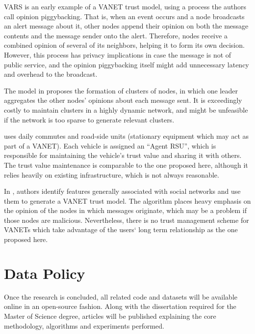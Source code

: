 \documentclass[12pt]{article}
\begin{document}
VARS \cite{dotzer2005vars} is an early example of a VANET trust model, using a process the authors call opinion piggybacking.
That is, when an event occurs and a node broadcasts an alert message about it, other nodes append their opinion on both the message contents and the message sender onto the alert.
Therefore, nodes receive a combined opinion of several of its neighbors, helping it to form its own decision.
However, this process has privacy implications in case the message is not of public service, and the opinion piggybacking itself might add unnecessary latency and overhead to the broadcast.

The model in \cite{chen2010trust} proposes the formation of clusters of nodes, in which one leader aggregates the other nodes' opinions about each message sent.
It is exceedingly costly to maintain clusters in a highly dynamic network, and might be unfeasible if the network is too sparse to generate relevant clusters.

\cite{park2011long} uses daily commutes and road-side units (stationary equipment which may act as part of a VANET).
Each vehicle is assigned an ``Agent RSU'', which is responsible for maintaining the vehicle's trust value and sharing it with others.
The trust value maintenance is comparable to the one proposed here, although it relies heavily on existing infrastructure, which is not always reasonable.

In \cite{huang2014social}, authors identify features generally associated with social networks and use them to generate a VANET trust model.
The algorithm places heavy emphasis on the opinion of the nodes in which messages originate, which may be a problem if those nodes are malicious. Nevertheless, there is no trust management scheme for VANETs which take advantage of the users`  long term relationship as the one proposed here.

\section{Data Policy}
Once the research is concluded, all related code and datasets will be available online in an open-source fashion.
Along with the dissertation required for the Master of Science degree, articles will be published explaining the core methodology, algorithms and experiments performed.



\end{document}
